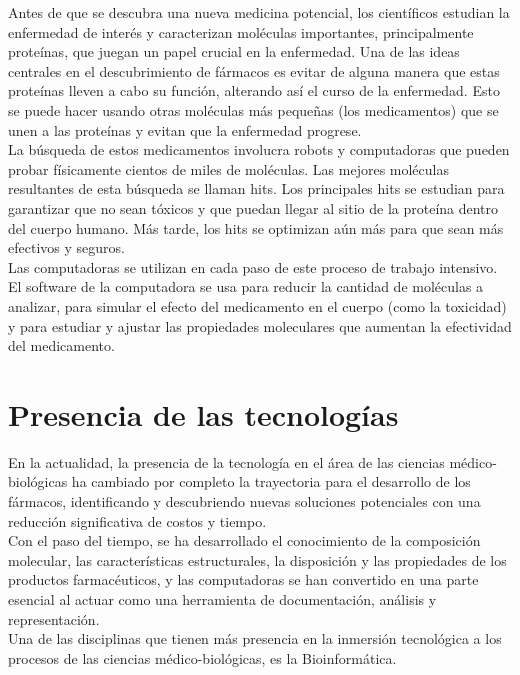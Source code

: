 \noindent Antes de que se descubra una nueva medicina potencial, los científicos estudian la enfermedad de interés y caracterizan moléculas importantes, principalmente proteínas, que juegan un papel crucial en la enfermedad. Una de las ideas centrales en el descubrimiento de fármacos es evitar de alguna manera que estas proteínas lleven a cabo su función, alterando así el curso de la enfermedad. Esto se puede hacer usando otras moléculas más pequeñas (los medicamentos) que se unen a las proteínas y evitan que la enfermedad progrese.\\

\noindent La búsqueda de estos medicamentos involucra robots y computadoras que pueden probar físicamente cientos de miles de moléculas. Las mejores moléculas resultantes de esta búsqueda se llaman hits. Los principales hits se estudian para garantizar que no sean tóxicos y que puedan llegar al sitio de la proteína dentro del cuerpo humano. Más tarde, los hits se optimizan aún más para que sean más efectivos y seguros.\\

\noindent Las computadoras se utilizan en cada paso de este proceso de trabajo intensivo. El software de la computadora se usa para reducir la cantidad de moléculas a analizar, para simular el efecto del medicamento en el cuerpo (como la toxicidad) y para estudiar y ajustar las propiedades moleculares que aumentan la efectividad del medicamento.\cite{2}\\

\section{Presencia de las tecnologías}
\noindent En la actualidad, la presencia de la tecnología en el área de las ciencias médico-biológicas ha cambiado por completo la trayectoria para el desarrollo de los fármacos, identificando y descubriendo nuevas soluciones potenciales con una reducción significativa de costos y tiempo.\\

\noindent Con el paso del tiempo, se ha desarrollado el conocimiento de la composición molecular, las características estructurales, la disposición y las propiedades de los productos farmacéuticos, y las computadoras se han convertido en una parte esencial al actuar como una herramienta de documentación, análisis y representación.\\

\noindent Una de las disciplinas que tienen más presencia en la inmersión tecnológica a los procesos de las ciencias médico-biológicas, es la Bioinformática.
